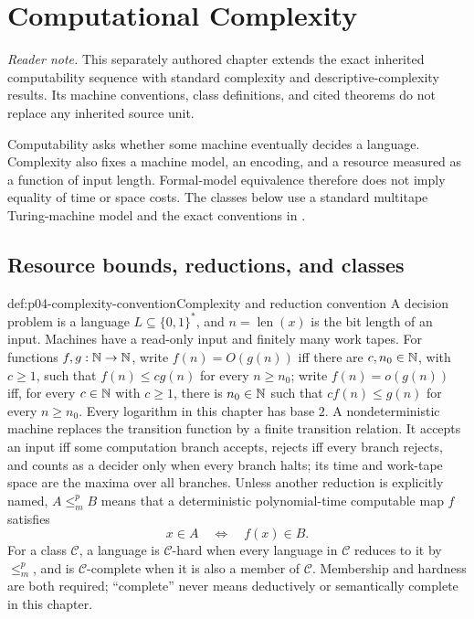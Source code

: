 
\chapter{Computational Complexity}
\label{sec:p04-complexity}

\noindent\textit{Reader note.} This separately authored chapter extends the
exact inherited computability sequence with standard complexity and
descriptive-complexity results.  Its machine conventions, class definitions,
and cited theorems do not replace any inherited source unit.

Computability asks whether some machine eventually decides a language.
Complexity also fixes a machine model, an encoding, and a resource measured as
a function of input length.  Formal-model equivalence therefore does not imply
equality of time or space costs.  The classes below use a standard multitape
Turing-machine model and the exact conventions in
\cite[chaps.~1--5]{AroraBarak2009}.

\section{Resource bounds, reductions, and classes}
\label{sec:p04-complexity-classes}

\begin{hbconvention}{def:p04-complexity-convention}{Complexity and reduction convention}
A decision problem is a language \(L\subseteq\{0,1\}^*\), and
\(n=\operatorname{len}(x)\) is the bit length of an input.  Machines have a read-only
input and finitely many work tapes.  For functions \(f,g:\mathbb{N}\to\mathbb{N}\), write
\(f(n)=O(g(n))\) iff there are \(c,n_0\in\mathbb{N}\), with \(c\geq1\), such that
\(f(n)\leq c g(n)\) for every \(n\geq n_0\); write \(f(n)=o(g(n))\) iff,
for every \(c\in\mathbb{N}\) with \(c\geq1\), there is \(n_0\in\mathbb{N}\) such that
\(c f(n)\leq g(n)\) for every \(n\geq n_0\).  Every logarithm in this
chapter has base \(2\).  A nondeterministic machine replaces the transition
function by a finite transition relation.  It accepts an input iff some
computation branch accepts, rejects iff every branch rejects, and counts as a
decider only when every branch halts; its time and work-tape space are the
maxima over all branches.  Unless another reduction is explicitly
named, \(A\leq_m^pB\) means that a deterministic polynomial-time computable
map \(f\) satisfies
\[
 x\in A\quad\Leftrightarrow\quad f(x)\in B.
\]
For a class \(\mathcal C\), a language is \(\mathcal C\)-hard when every
language in \(\mathcal C\) reduces to it by \(\leq_m^p\), and is
\(\mathcal C\)-complete when it is also a member of \(\mathcal C\).
Membership and hardness are both required; ``complete'' never means
deductively or semantically complete in this chapter.
\end{hbconvention}


